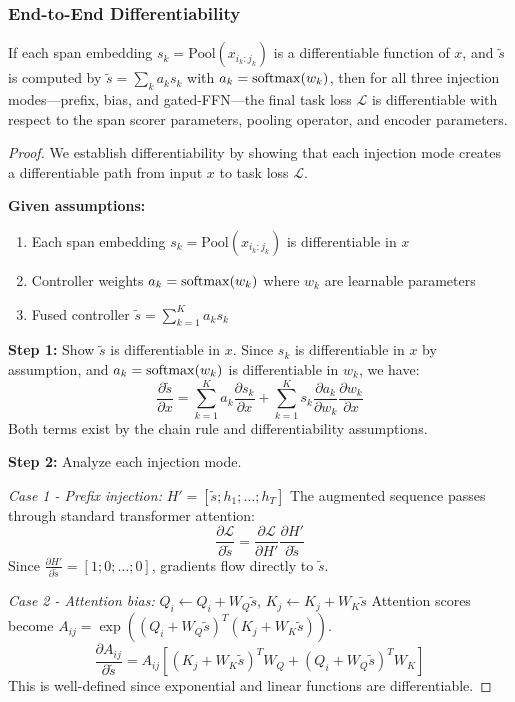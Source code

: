 \subsubsection{End-to-End Differentiability}
\begin{proposition}
	\label{prop:controller_diff}
	If each span embedding \(s_k=\mathrm{Pool}(x_{i_k:j_k})\) is a differentiable function of \(x\), and \(\tilde{s}\) is computed by
	\(\tilde{s}=\sum_k a_k s_k\) with \(a_k=\mathrm{softmax}(w_k)\), then for all three injection modes—prefix, bias, and gated-FFN—the final task loss \(\mathcal{L}\) is differentiable with respect to the span scorer parameters, pooling operator, and encoder parameters.
\end{proposition}
\begin{proof}
	We establish differentiability by showing that each injection mode creates a differentiable path from input \(x\) to task loss \(\mathcal{L}\).
	
	\textbf{Given assumptions:}
	\begin{enumerate}
		\item Each span embedding \(s_k = \mathrm{Pool}(x_{i_k:j_k})\) is differentiable in \(x\)
		\item Controller weights \(a_k = \mathrm{softmax}(w_k)\) where \(w_k\) are learnable parameters
		\item Fused controller \(\tilde{s} = \sum_{k=1}^K a_k s_k\)
	\end{enumerate}
	
	\textbf{Step 1:} Show \(\tilde{s}\) is differentiable in \(x\).
	Since \(s_k\) is differentiable in \(x\) by assumption, and \(a_k = \mathrm{softmax}(w_k)\) is differentiable in \(w_k\), we have:
	\[
	\frac{\partial \tilde{s}}{\partial x} = \sum_{k=1}^K a_k \frac{\partial s_k}{\partial x} + \sum_{k=1}^K s_k \frac{\partial a_k}{\partial w_k} \frac{\partial w_k}{\partial x}
	\]
	Both terms exist by the chain rule and differentiability assumptions.
	
	\textbf{Step 2:} Analyze each injection mode.
	
	\textit{Case 1 - Prefix injection:} \(H' = [\tilde{s}; h_1; \ldots; h_T]\)
	The augmented sequence passes through standard transformer attention:
	\[
	\frac{\partial \mathcal{L}}{\partial \tilde{s}} = \frac{\partial \mathcal{L}}{\partial H'} \frac{\partial H'}{\partial \tilde{s}}
	\]
	Since \(\frac{\partial H'}{\partial \tilde{s}} = [1; 0; \ldots; 0]\), gradients flow directly to \(\tilde{s}\).
	
	\textit{Case 2 - Attention bias:} \(Q_i \leftarrow Q_i + W_Q \tilde{s}\), \(K_j \leftarrow K_j + W_K \tilde{s}\)
	Attention scores become \(A_{ij} = \exp((Q_i + W_Q \tilde{s})^T(K_j + W_K \tilde{s}))\).
	\[
	\frac{\partial A_{ij}}{\partial \tilde{s}} = A_{ij} \left[ (K_j + W_K \tilde{s})^T W_Q + (Q_i + W_Q \tilde{s})^T W_K \right]
	\]
	This is well-defined since exponential and linear functions are differentiable.
	

\end{proof}

